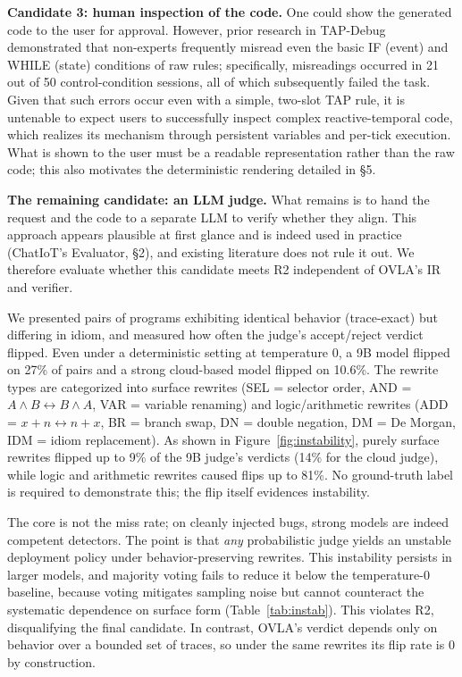 \documentclass[sigconf,nonacm,anonymous,review]{acmart}
\begin{document}
\textbf{Candidate 3: human inspection of the code.} One could show the generated code to the user for approval. However, prior research in TAP-Debug~\cite{tapdebug} demonstrated that non-experts frequently misread even the basic IF (event) and WHILE (state) conditions of raw rules; specifically, misreadings occurred in 21 out of 50 control-condition sessions, all of which subsequently failed the task. Given that such errors occur even with a simple, two-slot TAP rule, it is untenable to expect users to successfully inspect complex reactive-temporal code, which realizes its mechanism through persistent variables and per-tick execution. What is shown to the user must be a readable representation rather than the raw code; this also motivates the deterministic rendering detailed in \S5.

\textbf{The remaining candidate: an LLM judge.} What remains is to hand the request and the code to a separate LLM to verify whether they align. This approach appears plausible at first glance and is indeed used in practice (ChatIoT's Evaluator, \S2), and existing literature does not rule it out. We therefore evaluate whether this candidate meets R2 independent of OVLA's IR and verifier.

We presented pairs of programs exhibiting identical behavior (trace-exact) but differing in idiom, and measured how often the judge's accept/reject verdict flipped. Even under a deterministic setting at temperature 0, a 9B model flipped on 27\% of pairs and a strong cloud-based model flipped on 10.6\%. The rewrite types are categorized into surface rewrites (SEL = selector order, AND = $A{\wedge}B{\leftrightarrow}B{\wedge}A$, VAR = variable renaming) and logic/arithmetic rewrites (ADD = $x{+}n{\leftrightarrow}n{+}x$, BR = branch swap, DN = double negation, DM = De Morgan, IDM = idiom replacement). As shown in Figure~\ref{fig:instability}, purely surface rewrites flipped up to 9\% of the 9B judge's verdicts (14\% for the cloud judge), while logic and arithmetic rewrites caused flips up to 81\%. No ground-truth label is required to demonstrate this; the flip itself evidences instability.

The core is not the miss rate; on cleanly injected bugs, strong models are indeed competent detectors. The point is that \emph{any} probabilistic judge yields an unstable deployment policy under behavior-preserving rewrites. This instability persists in larger models, and majority voting fails to reduce it below the temperature-0 baseline, because voting mitigates sampling noise but cannot counteract the systematic dependence on surface form (Table~\ref{tab:instab}). This violates R2, disqualifying the final candidate. In contrast, OVLA's verdict depends only on behavior over a bounded set of traces, so under the same rewrites its flip rate is 0 by construction.
\end{document}

